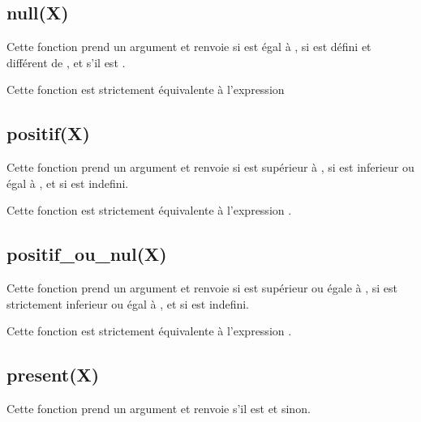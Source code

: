 \documentclass[letterpaper,10pt,french]{sphinxmanual}
\begin{document}
\subsection{null(X)}
\label{\detokenize{fonctions:null-x}}
\sphinxAtStartPar
Cette fonction prend un argument  et renvoie  si  est
égal à ,  si  est défini et différent de ,
et  s’il est .

\sphinxAtStartPar
Cette fonction est strictement équivalente à l’expression 


\subsection{positif(X)}
\label{\detokenize{fonctions:positif-x}}
\sphinxAtStartPar
Cette fonction prend un argument  et renvoie  si  est
 supérieur à ,  si  est inferieur ou égal à , et
 si  est indefini.

\sphinxAtStartPar
Cette fonction est strictement équivalente à l’expression .


\subsection{positif\_ou\_nul(X)}
\label{\detokenize{fonctions:positif-ou-nul-x}}
\sphinxAtStartPar
Cette fonction prend un argument  et renvoie  si  est
supérieur ou égale à ,  si  est strictement inferieur ou égal à
, et  si  est indefini.

\sphinxAtStartPar
Cette fonction est strictement équivalente à l’expression .


\subsection{present(X)}
\label{\detokenize{fonctions:present-x}}
\sphinxAtStartPar
Cette fonction prend un argument  et renvoie  s’il
est  et  sinon.
\end{document}
